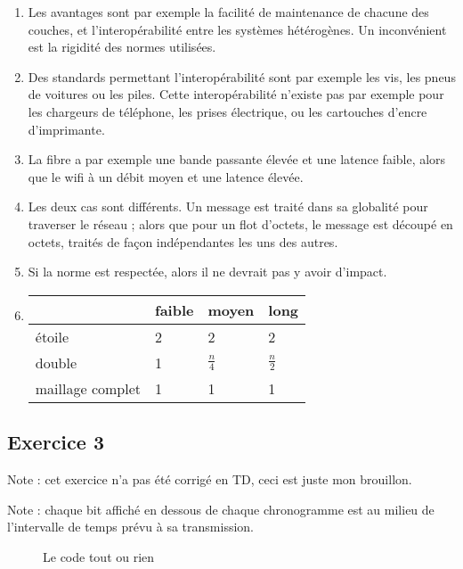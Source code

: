 \begin{enumerate}
	\item Les avantages sont par exemple la facilité de maintenance de chacune des couches, et l'interopérabilité entre les systèmes hétérogènes. Un inconvénient est la rigidité des normes utilisées.
	\item Des standards permettant l'interopérabilité sont par exemple les vis, les pneus de voitures ou les piles. Cette interopérabilité n'existe pas par exemple pour les chargeurs de téléphone, les prises électrique, ou les cartouches d'encre d'imprimante.
	\item La fibre a par exemple une bande passante élevée et une latence faible, alors que le wifi à un débit moyen et une latence élevée.
	\item Les deux cas sont différents. Un message est traité dans sa globalité pour traverser le réseau ; alors que pour un flot d'octets, le message est découpé en octets, traités de façon indépendantes les uns des autres.
	\item Si la norme est respectée, alors il ne devrait pas y avoir d'impact.
	\item
		\begin{tabular}[t]{|l|l|l|l|}
\hline
 & faible & moyen & long \\ \hline
étoile & 2 & 2 & 2 \\ \hline
double & 1 & $\frac{n}{4}$ & $\frac{n}{2}$ \\ \hline
maillage complet & 1 & 1 & 1 \\ \hline
\end{tabular}
\end{enumerate}

\subsection{Exercice 3}

Note : cet exercice n'a pas été corrigé en TD, ceci est juste mon brouillon.

Note : chaque bit affiché en dessous de chaque chronogramme est au milieu de l'intervalle de temps prévu à sa transmission.

\begin{figure}[H]
\centering
{}
\caption{Le code tout ou rien}
\end{figure}

